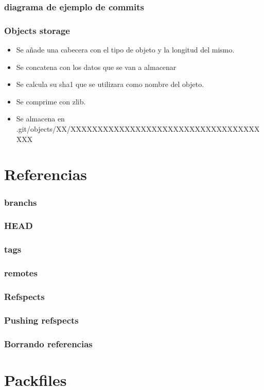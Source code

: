 \documentclass[10pt]{beamer}
\begin{document}
  \begin{frame}
    \frametitle{diagrama de ejemplo de commits}
  \end{frame}

  \begin{frame}
    \frametitle{Objects storage}
    \begin{itemize}
        \item Se añade una cabecera con el tipo de objeto y la longitud del mismo.
        \item Se concatena con los datos que se van a almacenar
        \item Se calcula su sha1 que se utilizara como nombre del objeto.
        \item Se comprime con zlib.
        \item Se almacena en .git/objects/XX/XXXXXXXXXXXXXXXXXXXXXXXXXXXXXXXXXXXXXX
    \end{itemize}
  \end{frame}

  \section*{Referencias}

  \begin{frame}
    \frametitle{branchs}
  \end{frame}

  \begin{frame}
    \frametitle{HEAD}
  \end{frame}

  \begin{frame}
    \frametitle{tags}
  \end{frame}

  \begin{frame}
    \frametitle{remotes}
  \end{frame}

  \begin{frame}
    \frametitle{Refspects}
  \end{frame}

  \begin{frame}
    \frametitle{Pushing refspects}
  \end{frame}

  \begin{frame}
    \frametitle{Borrando referencias}
  \end{frame}

  \section*{Packfiles}
\end{document}
